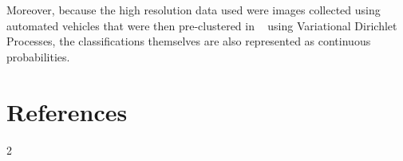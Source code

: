 \documentclass[10pt,sts]{article}
\begin{document}
\begin{multicols}{2}
Moreover, because the high resolution data used were images collected using automated vehicles that were then pre-clustered in ~\citet{steinberg11} using Variational Dirichlet Processes, the classifications themselves are also represented as continuous probabilities.

\section{References}





\end{multicols}{2}
\end{document}
